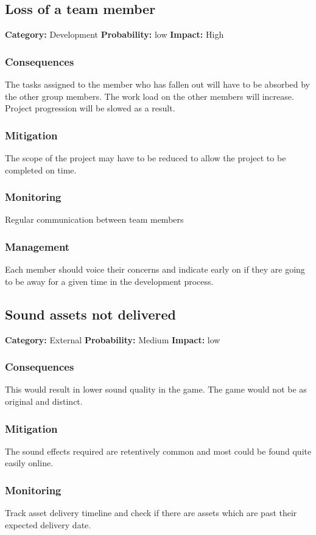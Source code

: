 \documentclass[a4paper,10pt]{article}
\begin{document}
\subsection{Loss of a team member}
\textbf{Category:} Development\newline
\textbf{Probability:} low\newline
\textbf{Impact:} High
\subsubsection*{Consequences}
The tasks assigned to the member who has fallen out will have to be absorbed by the other group members. The work load on the other members will increase. Project progression will be slowed as a result.
\subsubsection*{Mitigation}
The scope of the project may have to be reduced to allow the project to be completed on time. 
\subsubsection*{Monitoring}
Regular communication between team members
\subsubsection*{Management}
Each member should voice their concerns and indicate early on if they are going to be away for a given time in the development process.

\subsection{Sound assets not delivered}
\textbf{Category:} External\newline
\textbf{Probability:} Medium\newline
\textbf{Impact:} low
\subsubsection*{Consequences}
This would result in lower sound quality in the game.
The game would not be as original and distinct.
\subsubsection*{Mitigation}
The sound effects required are retentively common and most could be found quite easily online.
\subsubsection*{Monitoring}
Track asset delivery timeline and check if there are assets which are past their expected delivery date.
\end{document}
